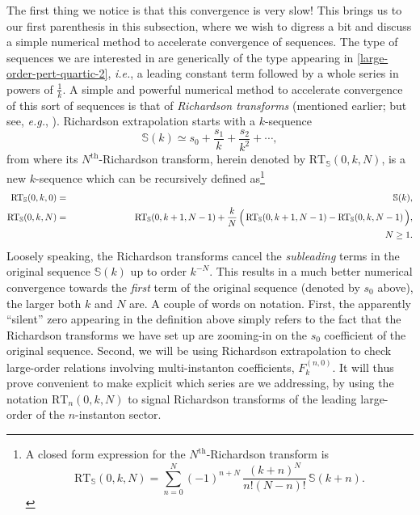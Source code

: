 \documentclass[11pt,a4paper]{article}
\def\BS{{\mathbb S}}
\newcommand{\be}{\begin{equation}}
\newcommand{\ee}{\end{equation}}
\begin{document}
The first thing we notice is that this convergence is very slow! This brings us to our first parenthesis in this subsection, where we wish to digress a bit and discuss a simple numerical method to accelerate convergence of sequences. The type of sequences we are interested in are generically of the type appearing in \eqref{large-order-pert-quartic-2}, \textit{i.e.}, a leading constant term followed by a whole series in powers of $\frac{1}{k}$. A simple and powerful numerical method to accelerate convergence of this sort of sequences is that of \textit{Richardson transforms} (mentioned earlier; but see, \textit{e.g.}, \cite{bo78}). Richardson extrapolation starts with a $k$-sequence
%
\be
\label{sequence-large-order}
\BS (k) \simeq s_0 + \frac{s_1}{k} + \frac{s_2}{k^2} + \cdots,
\ee
%
\noindent
from where its $N^{\text{th}}$-Richardson transform, herein denoted by $\mathrm{RT}_{\BS} (0,k,N)$, is a new $k$-sequence which can be recursively defined as\footnote{A closed form expression for the $N^{\text{th}}$-Richardson transform is
%
\be
\mathrm{RT}_{\BS} (0,k,N) = \sum_{n=0}^N (-1)^{n+N}\, \frac{\left(k+n\right)^N}{n! \left(N-n\right)!}\, \BS(k+n).
\ee
}
%
\begin{eqnarray}
\mathrm{RT}_{\BS} (0,k,0) &=& \BS(k), \\
\mathrm{RT}_{\BS} (0,k,N) &=& \mathrm{RT}_{\BS} (0,k+1,N-1) + \frac{k}{N}\, \Big(\, \mathrm{RT}_{\BS} (0,k+1,N-1) - \mathrm{RT}_{\BS} (0,k,N-1)\, \Big), \\
&&
\hspace{+340pt} N \ge 1. \nonumber
\end{eqnarray}
%
\noindent
Loosely speaking, the Richardson transforms cancel the \textit{subleading} terms in the original sequence $\BS(k)$ up to order $k^{-N}$. This results in a much better numerical convergence towards the \textit{first} term of the original sequence (denoted by $s_0$ above), the larger both $k$ and $N$ are. A couple of words on notation. First, the apparently ``silent'' zero appearing in the definition above simply refers to the fact that the Richardson transforms we have set up are zooming-in on the $s_0$ coefficient of the original sequence. Second, we will be using Richardson extrapolation to check large-order relations involving multi-instanton coefficients, $F_k^{(n,0)}$. It will thus prove convenient to make explicit which series are we addressing, by using the notation $\mathrm{RT}_n (0,k,N)$ to signal Richardson transforms of the leading large-order of the $n$-instanton sector.
\end{document}
